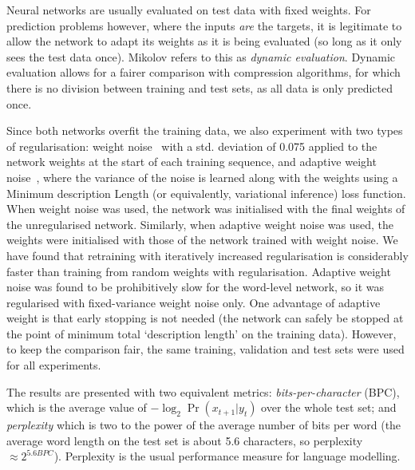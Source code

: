 \documentclass{article}
\begin{document}
Neural networks are usually evaluated on test data with fixed weights.
For prediction problems however, where the inputs \emph{are} the targets, it is legitimate to allow the network to adapt its weights as it is being evaluated (so long as it only sees the test data once).
Mikolov refers to this as \emph{dynamic evaluation}.
Dynamic evaluation allows for a fairer comparison with compression algorithms, for which there is no division between training and test sets, as all data is only predicted once.

Since both networks overfit the training data, we also experiment with two types of regularisation: weight noise~\cite{chuen96noise} with a std. deviation of 0.075 applied to the network weights at the start of each training sequence, and adaptive weight noise~\cite{graves11nips}, where the variance of the noise is learned along with the weights using a Minimum description Length (or equivalently, variational inference) loss function.
When weight noise was used, the network was initialised with the final weights of the unregularised network.
Similarly, when adaptive weight noise was used, the weights were initialised with those of the network trained with weight noise.
We have found that retraining with iteratively increased regularisation is considerably faster than  training from random weights with regularisation.
Adaptive weight noise was found to be prohibitively slow for the word-level network, so it was regularised with fixed-variance weight noise only.
One advantage of adaptive weight is that early stopping is not needed (the network can safely be stopped at the point of minimum total `description length' on the training data). 
However, to keep the comparison fair, the same training, validation and test sets were used for all experiments.

The results are presented with two equivalent metrics: \emph{bits-per-character} (BPC), which is the average value of  $-\log_2 \Pr(x_{t+1}|y_t)$ over the whole test set; and \emph{perplexity} which is two to the power of the average number of bits per word (the average word length on the test set is about 5.6 characters, so perplexity $\approx 2^{5.6 BPC}$). 
Perplexity is the usual performance measure for language modelling.
\end{document}
